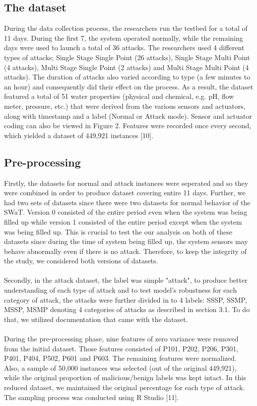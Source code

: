 \documentclass{article}
\begin{document}
\subsection{The dataset}
During the data collection process, the researchers run the testbed for a total of 11 days. During the first 7, the system operated normally, while the remaining days were used to launch a total of 36 attacks. The researchers used 4 different types of attacks; Single Stage Single Point (26 attacks), Single Stage Multi Point (4 attacks), Multi Stage Single Point (2 attacks) and Multi Stage Multi Point (4 attacks). The duration of attacks also varied according to type (a few minutes to an hour) and consequently did their effect on the process. As a result, the dataset featured a total of 51 water properties (physical and chemical, e.g. pH, flow meter, pressure, etc.) that were derived from the various sensors and actuators, along with timestamp and a label (Normal or Attack mode). Sensor and actuator coding can also be viewed in Figure 2. Features were recorded once every second, which yielded a dataset of 449,921 instances [10].  

\subsection{Pre-processing}
Firstly, the datasets for normal and attack instances were seperated and so they were combined in order to produce dataset covering entire 11 days. Further, we had two sets of datasets since there were two datasets for normal behavior of the SWaT. Version 0 consisted of the entire period even when the system was being filled up while version 1 consisted of the entire period except when the system was being filled up. This is crucial to test the our analysis on both of these datasets since during the time of system being filled up, the system sensors may behave abnormally even if there is no attack. Therefore, to keep the integrity of the study, we considered both versions of datasets. 
\\
\\
Secondly, in the attack dataset, the label was simple "attack", to produce better understanding of each type of attack and to test model's robustness for each category of attack, the attacks were further divided in to 4 labels: SSSP, SSMP, MSSP, MSMP denoting 4 categories of attacks as described in section 3.1. To do that, we utilized documentation that came with the dataset. 
\\
\\
During the pre-processing phase, nine features of zero variance were removed from the initial dataset. Those features consisted of P101, P202, P206, P301, P401, P404, P502, P601 and P603. The remaining features were normalized. Also, a sample of 50,000 instances was selected (out of the original 449,921), while the original proportion of malicious/benign labels was kept intact. In this reduced dataset, we maintained the original percentage for each type of attack. The sampling process was conducted using R Studio [11]. 
\\
\\
\end{document}
